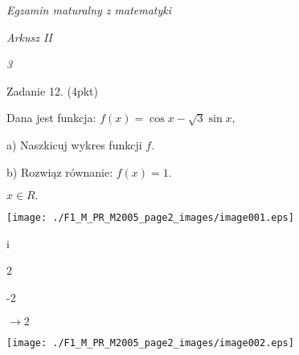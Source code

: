 \documentclass[a4paper,12pt]{article}
\begin{document}
{\it Egzamin maturalny z matematyki}

{\it Arkusz II}

{\it 3}

Zadanie 12. (4pkt)

Dana jest funkcja: $f(x)=\cos x-\sqrt{3}\sin x,$

a) Naszkicuj wykres funkcji $f.$

b) Rozwiąz równanie: $f(x)=1.$

$x\in R.$
\begin{center}
\texttt{[image: ./F1\_M\_PR\_M2005\_page2\_images/image001.eps]}
\end{center}
i

2

-2

$\rightarrow 2$
\begin{center}
\texttt{[image: ./F1\_M\_PR\_M2005\_page2\_images/image002.eps]}
\end{center}
\end{document}
